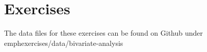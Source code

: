 %
%
%
%
%
\section{Exercises}
\label{sec:bivariate-analysis-exercises}

The data files for these exercises can be found on Github under emph{exercises/data/bivariate-analysis}

